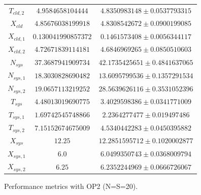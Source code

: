 \begin{figure}
\begin{center}
\begin{tabular}{|c||c|c|}
$T_{cld,2}$  & $4.9584658104444$ & $4.8350983148\pm 0.0537793315$ \\ 
$X_{cld}$  & $4.85676038199918$ & $4.8308542672\pm 0.0900199085$ \\ 
$X_{cld,1}$  & $0.130041990857372$ & $0.1461573408\pm 0.0056344117$ \\ 
$X_{cld,2}$  & $4.72671839114181$ & $4.6846969265\pm 0.0850510603$ \\ 
\hline 
$N_{sys}$  & $37.3687941909734$ & $42.1735425651\pm 0.4841637065$ \\ 
$N_{sys,1}$  & $18.3030828690482$ & $13.6095799536\pm 0.1357291534$ \\ 
$N_{sys,2}$  & $19.0657113219252$ & $28.5639626116\pm 0.3531052396$ \\ 
$T_{sys}$  & $4.48013019690775$ & $3.4029598386\pm 0.0341771009$ \\ 
$T_{sys,1}$  & $1.69742545748866$ & $2.2364277477\pm 0.019497486$ \\ 
$T_{sys,2}$  & $7.15152674675009$ & $4.5340442283\pm 0.0450395882$ \\ 
$X_{sys}$  & $12.25$ & $12.2851595712\pm 0.1020002877$ \\ 
$X_{sys,1}$  & $6.0$ & $6.0499350743\pm 0.0368009794$ \\ 
$X_{sys,2}$  & $6.25$ & $6.2352244969\pm 0.0666726067$ \\ 
\hline
		\end{tabular}
	\end{center}
	\caption{Performance metrics with OP2 (N=S=20).}
	\label{tbl:evaluation-performance-metrics-2-20}
\end{figure}

